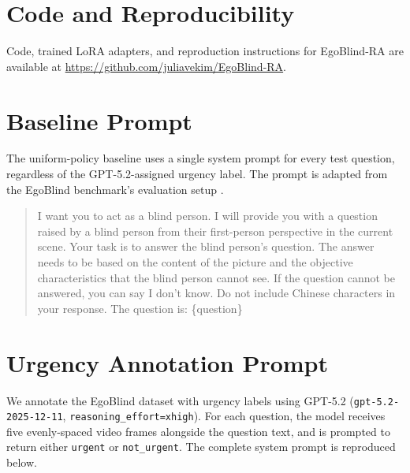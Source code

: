 \documentclass{article}
\begin{document}
\section{Code and Reproducibility}
Code, trained LoRA adapters, and reproduction instructions for EgoBlind-RA are available at \url{https://github.com/juliavekim/EgoBlind-RA}.




\newpage 
\appendix 
 \section{Baseline Prompt}\label{app:baseline_prompts}

The uniform-policy baseline uses a single system prompt for every test question, regardless of the GPT-5.2-assigned urgency label. The prompt is adapted from the EgoBlind benchmark's evaluation setup \cite{xiao2025egoblind}.

\begin{quote}
\ttfamily\small
I want you to act as a blind person. I will provide you with a question raised by a blind person from their first-person perspective in the current scene. Your task is to answer the blind person's question. The answer needs to be based on the content of the picture and the objective characteristics that the blind person cannot see. If the question cannot be answered, you can say I don't know. Do not include Chinese characters in your response. The question is: \{question\}
\end{quote}

\section{Urgency Annotation Prompt}\label{app:annotation_prompt}

We annotate the EgoBlind dataset with urgency labels using GPT-5.2 (\texttt{gpt-5.2-2025-12-11}, \texttt{reasoning\_effort=xhigh}). For each question, the model receives five evenly-spaced video frames alongside the question text, and is prompted to return either \texttt{urgent} or \texttt{not\_urgent}. The complete system prompt is reproduced below.
\end{document}
